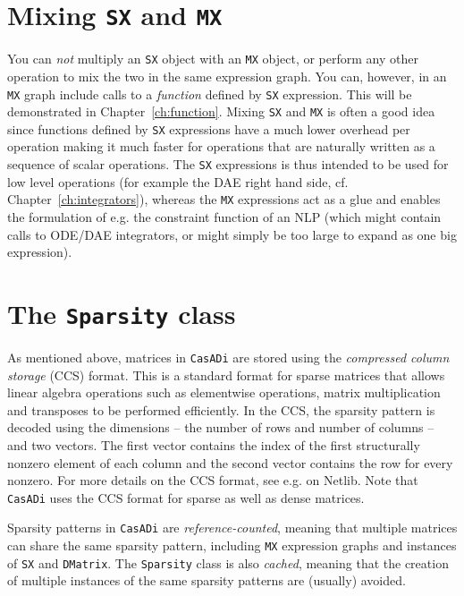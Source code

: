 \documentclass[a4paper,12pt]{book}
\newcommand{\CasADi}{\texttt{CasADi}\xspace}
\begin{document}
\section{Mixing \texttt{SX} and \texttt{MX}}
You can \emph{not} multiply an \texttt{SX} object with an \texttt{MX} object, or perform any other operation to mix the two in the same expression graph. You can, however, in an \texttt{MX} graph include calls to a \emph{function} defined by \texttt{SX} expression. This will be demonstrated in Chapter~\ref{ch:function}. Mixing \texttt{SX} and \texttt{MX} is often a good idea since functions defined by \texttt{SX} expressions have a much lower overhead per operation making it much faster for operations that are naturally written as a sequence of scalar operations. The \texttt{SX} expressions is thus intended to be used for low level operations (for example the DAE right hand side, cf. Chapter~\ref{ch:integrators}), whereas the \texttt{MX} expressions act as a glue and enables the formulation of e.g. the constraint function of an NLP (which might contain calls to ODE/DAE integrators, or might simply be too large to expand as one big expression).

\section{The \texttt{Sparsity} class} \label{sec:sparsity_class}
As mentioned above, matrices in \CasADi are stored using the \emph{compressed column storage} (CCS) format. This is a standard format for sparse matrices that allows linear algebra operations such as elementwise operations, matrix multiplication and transposes to be performed efficiently. In the CCS, the sparsity pattern is decoded using the dimensions -- the number of rows and number of columns -- and two vectors. The first vector contains the index of the first structurally nonzero element of each column and the second vector contains the row for every nonzero. For more details on the CCS format, see e.g.  on Netlib. Note that \CasADi uses the CCS format for sparse as well as dense matrices.

Sparsity patterns in \CasADi are \emph{reference-counted}, meaning that multiple matrices can share the same sparsity pattern, including \texttt{MX} expression graphs and instances of \texttt{SX} and \texttt{DMatrix}. The \texttt{Sparsity} class is also \emph{cached}, meaning that the creation of multiple instances of the same sparsity patterns are (usually) avoided.
\end{document}
